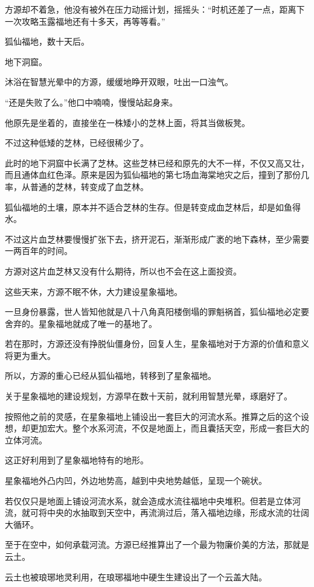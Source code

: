 \begin{this_body}
方源却不着急，他没有被外在压力动摇计划，摇摇头：“时机还差了一点，距离下一次攻略玉露福地还有十多天，再等等看。”

狐仙福地，数十天后。

地下洞窟。

沐浴在智慧光晕中的方源，缓缓地睁开双眼，吐出一口浊气。

“还是失败了么。”他口中喃喃，慢慢站起身来。

他原先是坐着的，直接坐在一株矮小的芝林上面，将其当做板凳。

不过这种低矮的芝林，已经很稀少了。

此时的地下洞窟中长满了芝林。这些芝林已经和原先的大不一样，不仅又高又壮，而且通体血红色泽。原来是因为狐仙福地的第七场血海棠地灾之后，撞到了那份几率，从普通的芝林，转变成了血芝林。

狐仙福地的土壤，原本并不适合芝林的生存。但是转变成血芝林后，却是如鱼得水。

不过这片血芝林要慢慢扩张下去，挤开泥石，渐渐形成广袤的地下森林，至少需要一两百年的时间。

方源对这片血芝林又没有什么期待，所以也不会在这上面投资。

这些天来，方源不眠不休，大力建设星象福地。

一旦身份暴露，世人皆知他就是八十八角真阳楼倒塌的罪魁祸首，狐仙福地必定要舍弃的。星象福地就成了唯一的基地了。

若在那时，方源还没有挣脱仙僵身份，回复人生，星象福地对于方源的价值和意义将更为重大。

所以，方源的重心已经从狐仙福地，转移到了星象福地。

关于星象福地的建设规划，方源早在数十天前，就利用智慧光晕，琢磨好了。

按照他之前的灵感，在星象福地上铺设出一套巨大的河流水系。推算之后的这个设想，却更加宏大。整个水系河流，不仅是地面上，而且囊括天空，形成一套巨大的立体河流。

这正好利用到了星象福地特有的地形。

星象福地外凸内凹，外边地势高，越到中央地势越低，呈现一个碗状。

若仅仅只是地面上铺设河流水系，就会造成水流往福地中央堆积。但若是立体河流，就可将中央的水抽取到天空中，再流淌过后，落入福地边缘，形成水流的壮阔大循环。

至于在空中，如何承载河流。方源已经推算出了一个最为物廉价美的方法，那就是云土。

云土也被琅琊地灵利用，在琅琊福地中硬生生建设出了一个云盖大陆。


\end{this_body}
